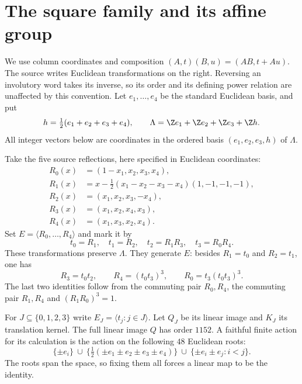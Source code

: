 \section{The square family and its affine group}
We use column coordinates and composition
$(A,t)(B,u)=(AB,t+Au)$. The source writes Euclidean transformations on
the right. Reversing an involutory word takes its inverse, so its order
and its defining power relation are unaffected by this convention.
Let $e_1,\ldots,e_4$ be the standard Euclidean basis, and put
\[
 h=\tfrac12(e_1+e_2+e_3+e_4),\qquad
 \Lambda=\Z e_1+\Z e_2+\Z e_3+\Z h.
\]
All integer vectors below are coordinates in the ordered basis
$(e_1,e_2,e_3,h)$ of $\Lambda$.

Take the five source reflections, here specified in Euclidean coordinates:
\begin{align*}
 R_0(x)&=(1-x_1,x_2,x_3,x_4),\\
 R_1(x)&=x-\tfrac12(x_1-x_2-x_3-x_4)(1,-1,-1,-1),\\
 R_2(x)&=(x_1,x_2,x_3,-x_4),\\
 R_3(x)&=(x_1,x_2,x_4,x_3),\\
 R_4(x)&=(x_1,x_3,x_2,x_4).
\end{align*}
Set $E=\langle R_0,\ldots,R_4\rangle$ and mark it by
\[
 t_0=R_1,\quad t_1=R_2,\quad t_2=R_1R_3,
 \quad t_3=R_0R_4.                                      \tag{S.1}
\]
These transformations preserve $\Lambda$. They generate $E$: besides
$R_1=t_0$ and $R_2=t_1$, one has
\[
 R_3=t_0t_2,\qquad R_4=(t_0t_3)^3,\qquad
 R_0=t_3(t_0t_3)^3.                                    \tag{S.2}
\]
The last two identities follow from the commuting pair $R_0,R_4$,
the commuting pair $R_1,R_4$ and $(R_1R_0)^3=1$.

For $J\subseteq\{0,1,2,3\}$ write $E_J=\langle t_j:j\in J\rangle$.
Let $Q_J$ be its linear image and $K_J$ its translation kernel.
The full linear image $Q$ has order $1152$. A faithful finite action
for its calculation is the action on the following $48$ Euclidean roots:
\[
 \{\pm e_i\}\ \cup\
 \{\tfrac12(\pm e_1\pm e_2\pm e_3\pm e_4)\}\ \cup\
 \{\pm e_i\pm e_j:i<j\}.                              \tag{S.3}
\]
The roots span the space, so fixing them all forces a linear map to
be the identity.


